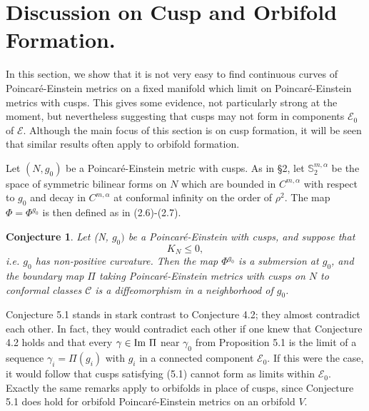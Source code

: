 \documentclass[11pt,amsfonts]{amsart}
\newtheorem{conjecture}[theorem]{Conjecture}
\begin{document}
\section{Discussion on Cusp and Orbifold Formation.}
\setcounter{equation}{0}

 In this section, we show that it is not very easy to find continuous 
curves of Poincar\'e-Einstein metrics on a fixed manifold which limit on 
Poincar\'e-Einstein metrics with cusps. This gives some evidence, not 
particularly strong at the moment, but nevertheless suggesting that cusps 
may not form in components ${\mathcal E}_{0}$ of ${\mathcal E}$. Although 
the main focus of this section is on cusp formation, it will be seen that 
similar results often apply to orbifold formation. 

\medskip

 Let $(N, g_{0})$ be a Poincar\'e-Einstein metric with cusps. As in \S 2, 
let ${\mathbb S}_{2}^{m,\alpha}$ be the space of symmetric bilinear forms 
on $N$ which are bounded in $C^{m,\alpha}$ with respect to $g_{0}$ and 
decay in $C^{m,\alpha}$ at conformal infinity on the order of 
$\rho^{2}$. The map $\Phi  = \Phi^{g_{0}}$ is then defined as in 
(2.6)-(2.7). 
\begin{conjecture} \label{c 5.1.}
  Let (N, $g_{0})$ be a Poincar\'e-Einstein with cusps, and suppose that 
\begin{equation} \label{e5.1}
K_{N} \leq  0, 
\end{equation}
i.e. $g_{0}$ has non-positive curvature. Then the map $\Phi^{g_{0}}$ is 
a submersion at $g_{0}$, and the boundary map $\Pi$ taking 
Poincar\'e-Einstein metrics with cusps on $N$ to conformal classes ${\mathcal C}$ 
is a diffeomorphism in a neighborhood of $g_{0}$. 
\end{conjecture}

 Conjecture 5.1 stands in stark contrast to Conjecture 4.2; they 
almost contradict each other. In fact, they would contradict each other 
if one knew that Conjecture 4.2 holds and that every $\gamma\in {\rm Im} \ \Pi$ 
near $\gamma_{0}$ from Proposition 5.1 is the limit of a sequence 
$\gamma_{i} = \Pi(g_{i})$ with $g_{i}$ in a connected component 
${\mathcal E}_{0}$. If this were the case, it would follow that cusps 
satisfying (5.1) cannot form as limits within ${\mathcal E}_{0}$. Exactly 
the same remarks apply to orbifolds in place of cusps, since Conjecture 5.1 
does hold for orbifold Poincar\'e-Einstein metrics on an orbifold $V$. 


\medskip
\end{document}

